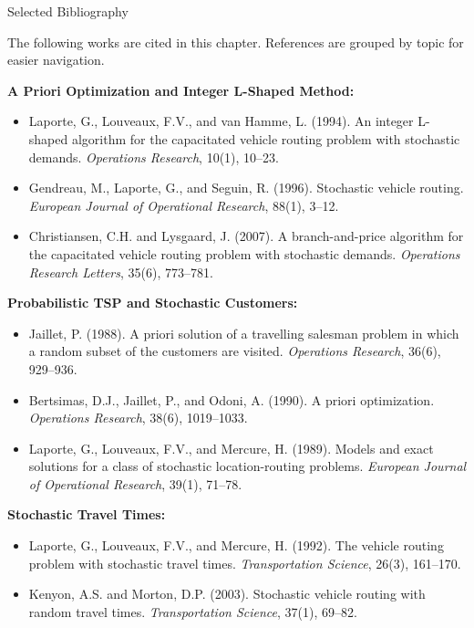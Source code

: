\documentclass[aspectratio=169,10pt]{beamer}
\begin{document}
\begin{frame}[allowframebreaks]{Selected Bibliography}

  The following works are cited in this chapter.
  References are grouped by topic for easier navigation.

  \textbf{A Priori Optimization and Integer L-Shaped Method:}
  \begin{itemize}
    \item Laporte, G., Louveaux, F.V., and van Hamme, L. (1994).
          An integer L-shaped algorithm for the capacitated vehicle routing
          problem with stochastic demands.
          \emph{Operations Research}, 10(1), 10--23.
    \item Gendreau, M., Laporte, G., and Seguin, R. (1996).
          Stochastic vehicle routing.
          \emph{European Journal of Operational Research}, 88(1), 3--12.
    \item Christiansen, C.H. and Lysgaard, J. (2007).
          A branch-and-price algorithm for the capacitated vehicle routing
          problem with stochastic demands.
          \emph{Operations Research Letters}, 35(6), 773--781.
  \end{itemize}

  \textbf{Probabilistic TSP and Stochastic Customers:}
  \begin{itemize}
    \item Jaillet, P. (1988).
          A priori solution of a travelling salesman problem in which
          a random subset of the customers are visited.
          \emph{Operations Research}, 36(6), 929--936.
    \item Bertsimas, D.J., Jaillet, P., and Odoni, A. (1990).
          A priori optimization.
          \emph{Operations Research}, 38(6), 1019--1033.
    \item Laporte, G., Louveaux, F.V., and Mercure, H. (1989).
          Models and exact solutions for a class of stochastic location-routing
          problems.
          \emph{European Journal of Operational Research}, 39(1), 71--78.
  \end{itemize}

  \framebreak

  \textbf{Stochastic Travel Times:}
  \begin{itemize}
    \item Laporte, G., Louveaux, F.V., and Mercure, H. (1992).
          The vehicle routing problem with stochastic travel times.
          \emph{Transportation Science}, 26(3), 161--170.
    \item Kenyon, A.S. and Morton, D.P. (2003).
          Stochastic vehicle routing with random travel times.
          \emph{Transportation Science}, 37(1), 69--82.
  \end{itemize}


\end{frame}
\end{document}
